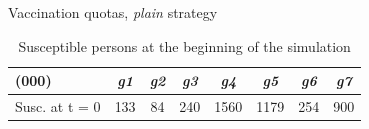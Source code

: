 \documentclass[9pt]{beamer}
\begin{document}
\begin{frame}{Vaccination quotas, \emph{plain} strategy}
\begin{table}[H]
\centering
\begin{small} %
\begin{tabular}{lccccccc}
\toprule
(000) & \emph{g1} & \emph{g2} & \emph{g3} & \emph{g4} & \emph{g5} & \emph{g6} & \emph{g7} \\
\midrule
Susc. at t = 0                   & 133 & 84 & 240 & 1560 & 1179 & 254 & 900 \\
\bottomrule  
\end{tabular}
\end{small}
\caption{Susceptible persons at the beginning of the simulation}
\label{susceptible}
\end{table}


\end{frame}
\end{document}
